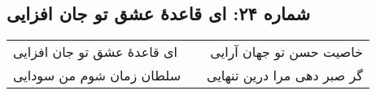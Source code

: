\begin{center}
\section*{شماره ۲۴: ای قاعدۀ عشق تو جان افزایی}
\label{sec:024}
\begin{longtable}{l p{0.5cm} r}
ای قاعدهٔ عشق تو جان افزایی
&&
خاصیت حسن تو جهان آرایی
\\
سلطان زمان شوم من سودایی
&&
گر صبر دهی مرا درین تنهایی
\\
\end{longtable}
\end{center}
